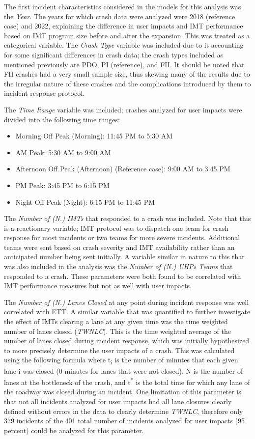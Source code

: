 \documentclass[
  letterpaper,
  authoryear]{elsarticle}
\begin{document}
The first incident characteristics considered in the models for this
analysis was the \emph{Year}. The years for which crash data were
analyzed were 2018 (reference case) and 2022, explaining the difference
in user impacts and IMT performance based on IMT program size before and
after the expansion. This was treated as a categorical variable. The
\emph{Crash Type} variable was included due to it accounting for some
significant differences in crash data; the crash types included as
mentioned previously are PDO, PI (reference), and FII. It should be
noted that FII crashes had a very small sample size, thus skewing many
of the results due to the irregular nature of these crashes and the
complications introduced by them to incident response protocol.

The \emph{Time Range} variable was included; crashes analyzed for user
impacts were divided into the following time ranges:

\begin{itemize}
\item
  Morning Off Peak (Morning): 11:45 PM to 5:30 AM
\item
  AM Peak: 5:30 AM to 9:00 AM
\item
  Afternoon Off Peak (Afternoon) (Reference case): 9:00 AM to 3:45 PM
\item
  PM Peak: 3:45 PM to 6:15 PM
\item
  Night Off Peak (Night): 6:15 PM to 11:45 PM
\end{itemize}

The \emph{Number of (N.) IMTs} that responded to a crash was included.
Note that this is a reactionary variable; IMT protocol was to dispatch
one team for crash response for most incidents or two teams for more
severe incidents. Additional teams were sent based on crash severity and
IMT availability rather than an anticipated number being sent initially.
A variable similar in nature to this that was also included in the
analysis was the \emph{Number of (N.) UHPs Teams} that responded to a
crash. These parameters were both found to be correlated with IMT
performance measures but not as well with user impacts.

The \emph{Number of (N.) Lanes Closed} at any point during incident
response was well correlated with ETT. A similar variable that was
quantified to further investigate the effect of IMTs clearing a lane at
any given time was the time weighted number of lanes closed
(\emph{TWNLC}). This is the time weighted average of the number of lanes
closed during incident response, which was initially hypothesized to
more precisely determine the user impacts of a crash. This was
calculated using the following formula where t\textsubscript{i} is the
number of minutes that each given lane i was closed (0 minutes for lanes
that were not closed), N is the number of lanes at the bottleneck of the
crash, and t\textsuperscript{*} is the total time for which any lane of
the roadway was closed during an incident. One limitation of this
parameter is that not all incidents analyzed for user impacts had all
lane closures clearly defined without errors in the data to clearly
determine \emph{TWNLC}, therefore only 379 incidents of the 401 total
number of incidents analyzed for user impacts (95 percent) could be
analyzed for this parameter.
\end{document}
